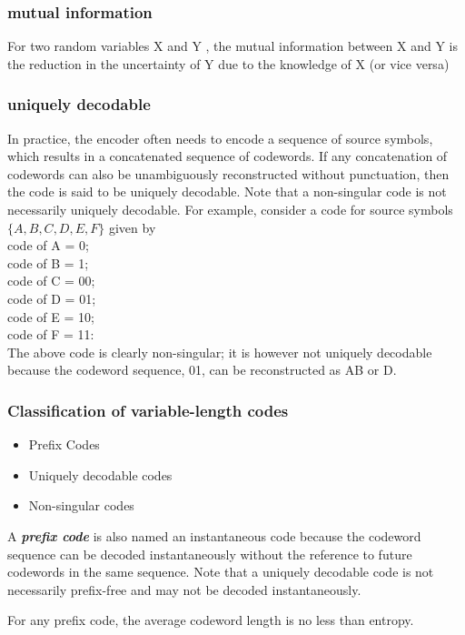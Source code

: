 \begin{frame}
\frametitle{mutual information}
For two random variables X and Y , the mutual information between X and
Y is the reduction in the uncertainty of Y due to the knowledge of X (or vice
versa)
\end{frame}

\begin{frame}
\frametitle{uniquely decodable}
In practice, the encoder often needs to encode a sequence of source symbols,
which results in a concatenated sequence of codewords. If any concatenation of
codewords can also be unambiguously reconstructed without punctuation, then
the code is said to be uniquely decodable. Note that a non-singular code is not
necessarily uniquely decodable. For example, consider a code for source symbols
$\{A,B,C,D,E, F \}$ given by\\
code of A = 0;\\
code of B = 1;\\
code of C = 00;\\
code of D = 01;\\
code of E = 10;\\
code of F = 11:\\
The above code is clearly non-singular; it is however not uniquely decodable
because the codeword sequence, 01, can be reconstructed as AB or D.
\end{frame}



\begin{frame}
\frametitle{Classification of variable-length codes}

\begin{itemize}
	\item Prefix Codes
	\item Uniquely decodable codes
	\item Non-singular codes
\end{itemize}

A \textbf{\emph{prefix code}} is also named an instantaneous code because the codeword sequence can be decoded instantaneously without the reference to future codewords
in the same sequence. Note that a uniquely decodable code is not necessarily
prefix-free and may not be decoded instantaneously.

For any prefix code, the average codeword length is no less than entropy.
\end{frame}

